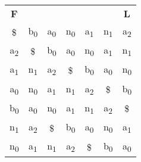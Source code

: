    \begin{center}
        \begin{tabular}{ c c c c c c c }
            \textbf{F}         &
                               &
                               &
                               &
                               &
                               &
            \textbf{L}         \\
        
            \$                 &
            b\textsubscript{0} &
            a\textsubscript{0} &
            n\textsubscript{0} &
            a\textsubscript{1} & 
            n\textsubscript{1} &
            a\textsubscript{2} \\
            
            a\textsubscript{2} &
            \$                 &
            b\textsubscript{0} &
            a\textsubscript{0} &
            n\textsubscript{0} &
            a\textsubscript{1} & 
            n\textsubscript{1} \\
            
            a\textsubscript{1} &
            n\textsubscript{1} &
            a\textsubscript{2} &
            \$                 &
            b\textsubscript{0} &
            a\textsubscript{0} &
            n\textsubscript{0} \\
            
            a\textsubscript{0} &
            n\textsubscript{0} &
            a\textsubscript{1} &
            n\textsubscript{1} &
            a\textsubscript{2} &
            \$                 &
            b\textsubscript{0} \\
            
            b\textsubscript{0} &
            a\textsubscript{0} &
            n\textsubscript{0} &
            a\textsubscript{1} &
            n\textsubscript{1} &
            a\textsubscript{2} &
            \$                 \\
            
            n\textsubscript{1} &
            a\textsubscript{2} &
            \$                 &
            b\textsubscript{0} &
            a\textsubscript{0} &
            n\textsubscript{0} &
            a\textsubscript{1} \\ 
            
            n\textsubscript{0} &
            a\textsubscript{1} &
            n\textsubscript{1} &
            a\textsubscript{2} &
            \$                 &
            b\textsubscript{0} &
            a\textsubscript{0} \\
        \end{tabular}
    \end{center}
    
